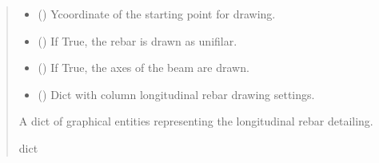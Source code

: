 \documentclass[a4paper,10pt,english]{sphinxmanual}
\begin{document}
\begin{fulllineitems}
\begin{fulllineitems}
\begin{quote}
\begin{description}
\begin{itemize}
\item {} 
\sphinxAtStartPar
{} (\sphinxstyleliteralemphasis{\sphinxupquote{, }}) \textendash{} Y\sphinxhyphen{}coordinate of the starting point for drawing.

\item {} 
\sphinxAtStartPar
{} () \textendash{} If True, the rebar is drawn as unifilar.

\item {} 
\sphinxAtStartPar
{} () \textendash{} If True, the axes of the beam are drawn.

\item {} 
\sphinxAtStartPar
{} () \textendash{} Dict with column longitudinal rebar drawing settings.

\end{itemize}

\sphinxAtStartPar
A dict of graphical entities representing the longitudinal rebar detailing.

\sphinxAtStartPar
dict

\end{description}\end{quote}

\end{fulllineitems}



\end{fulllineitems}
\end{document}
